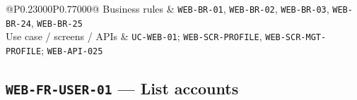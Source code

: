 \begin{longtable}{@{}P{0.23000\SRSWidth}P{0.77000\SRSWidth}@{}}
Business rules & \texttt{WEB-\allowbreak{}BR-\allowbreak{}01}, \texttt{WEB-\allowbreak{}BR-\allowbreak{}02}, \texttt{WEB-\allowbreak{}BR-\allowbreak{}03}, \texttt{WEB-\allowbreak{}BR-\allowbreak{}24}, \texttt{WEB-\allowbreak{}BR-\allowbreak{}25} \\[3pt]
Use case /\allowbreak{} screens /\allowbreak{} APIs & \texttt{UC-\allowbreak{}WEB-\allowbreak{}01}; \texttt{WEB-\allowbreak{}SCR-\allowbreak{}PROFILE}, \texttt{WEB-\allowbreak{}SCR-\allowbreak{}MGT-\allowbreak{}PROFILE}; \texttt{WEB-\allowbreak{}API-\allowbreak{}025} \\[3pt]
\end{longtable}
\endgroup

\subsection{\texttt{WEB-\allowbreak{}FR-\allowbreak{}USER-\allowbreak{}01} — List accounts}
\begingroup
\fontsize{9.5}{12}\selectfont
\setlength{\SRSWidth}{\dimexpr\linewidth-2\tabcolsep\relax}
